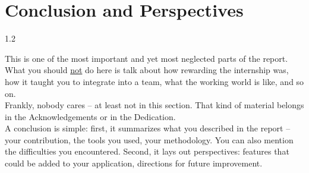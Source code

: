 \chapter{Conclusion and Perspectives}
\pagestyle{fancy}
\fancyhf{}
\fancyhead[R]{\bfseries\rightmark}
\fancyfoot[R]{\thepage}
\renewcommand{\headrulewidth}{0.5pt}
\renewcommand{\footrulewidth}{0pt}
\renewcommand{\chaptermark}[1]{\markboth{\MakeUppercase{\chaptername~\thechapter.\ #1}}{}}
\renewcommand{\sectionmark}[1]{\markright{\thechapter.\thesection~ #1}}

\begin{spacing}{1.2}

This is one of the most important and yet most neglected parts of the report.
What you should \underline{not} do here is talk about how rewarding the
internship was, how it taught you to integrate into a team, what the working
world is like, and so on.\\
Frankly, nobody cares -- at least not in this section. That kind of material
belongs in the Acknowledgements or in the Dedication.\\
A conclusion is simple: first, it summarizes what you described in the
report -- your contribution, the tools you used, your methodology. You can
also mention the difficulties you encountered. Second, it lays out
perspectives: features that could be added to your application, directions
for future improvement.

\end{spacing}
